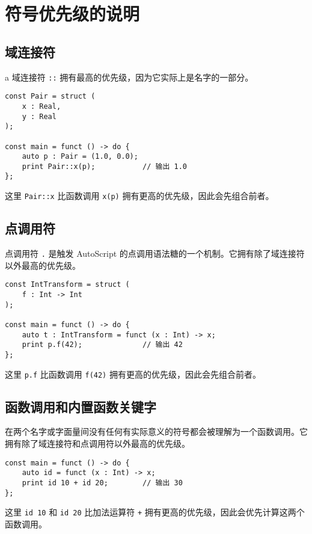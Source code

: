 \section{符号优先级的说明}

\subsection{域连接符}
a
域连接符 \lstinline!::! 拥有最高的优先级，因为它实际上是名字的一部分。

\begin{lstlisting}
const Pair = struct (
    x : Real,
    y : Real
);

const main = funct () -> do {
    auto p : Pair = (1.0, 0.0);
    print Pair::x(p);           // 输出 1.0
};
\end{lstlisting}

这里 \lstinline!Pair::x! 比函数调用 \lstinline!x(p)! 拥有更高的优先级，因此会先组合前者。

\subsection{点调用符}

点调用符 \lstinline!.! 是触发 AutoScript 的点调用语法糖的一个机制。它拥有除了域连接符以外最高的优先级。

\begin{lstlisting}
const IntTransform = struct (
    f : Int -> Int
);

const main = funct () -> do {
    auto t : IntTransform = funct (x : Int) -> x;
    print p.f(42);              // 输出 42
};
\end{lstlisting}

这里 \lstinline!p.f! 比函数调用 \lstinline!f(42)! 拥有更高的优先级，因此会先组合前者。

\subsection{函数调用和内置函数关键字}

在两个名字或字面量间没有任何有实际意义的符号都会被理解为一个函数调用。它拥有除了域连接符和点调用符以外最高的优先级。

\begin{lstlisting}
const main = funct () -> do {
    auto id = funct (x : Int) -> x;
    print id 10 + id 20;        // 输出 30
};
\end{lstlisting}

这里 \lstinline!id 10! 和 \lstinline!id 20! 比加法运算符 \lstinline!+! 拥有更高的优先级，因此会优先计算这两个函数调用。 \\

